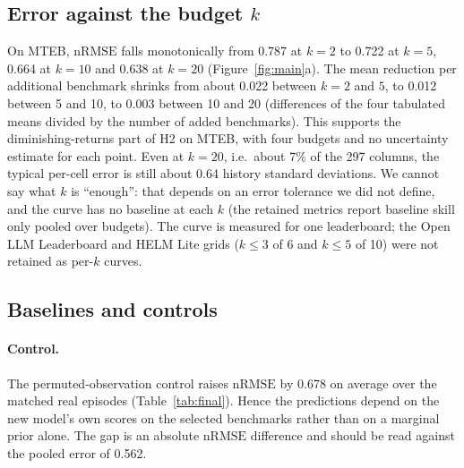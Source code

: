 \documentclass{article}
\newcommand{\nrmse}{\mathrm{nRMSE}}
\begin{document}
\subsection{Error against the budget $k$}
On MTEB, $\nrmse$ falls monotonically from 0.787 at $k{=}2$ to 0.722 at $k{=}5$, 0.664 at $k{=}10$ and 0.638 at $k{=}20$ (Figure~\ref{fig:main}a). %
The mean reduction per additional benchmark shrinks from about 0.022 between $k{=}2$ and $5$, to 0.012 between 5 and 10, to 0.003 between 10 and 20 (differences of the four tabulated means divided by the number of added benchmarks). This supports the diminishing-returns part of H2 on MTEB, with four budgets and no uncertainty estimate for each point. Even at $k{=}20$, i.e.\ about 7\% of the 297 columns, the typical per-cell error is still about 0.64 history standard deviations. We cannot say what $k$ is ``enough'': that depends on an error tolerance we did not define, and the curve has no baseline at each $k$ (the retained metrics report baseline skill only pooled over budgets). The curve is measured for one leaderboard; the Open LLM Leaderboard and HELM Lite grids ($k\le3$ of 6 and $k\le5$ of 10) were not retained as per-$k$ curves.

\subsection{Baselines and controls}
\paragraph{Control.} The permuted-observation control raises $\nrmse$ by 0.678 on average over the matched real episodes (Table~\ref{tab:final}). %
Hence the predictions depend on the new model's own scores on the selected benchmarks rather than on a marginal prior alone. The gap is an absolute $\nrmse$ difference and should be read against the pooled error of 0.562.
\end{document}
